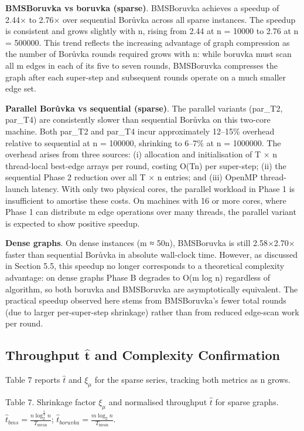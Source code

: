\documentclass[11pt]{article}
\theoremstyle{plain}
\theoremstyle{remark}
\begin{document}
\textbf{BMSBoruvka vs boruvka (sparse)}. BMSBoruvka achieves a speedup
of 2.44× to 2.76× over sequential Borůvka across all sparse instances.
The speedup is consistent and grows slightly with n, rising from 2.44 at
n = 10000 to 2.76 at n = 500000. This trend reflects the increasing
advantage of graph compression as the number of Borůvka rounds required
grows with n: while boruvka must scan all m edges in each of its five to
seven rounds, BMSBoruvka compresses the graph after each super-step and
subsequent rounds operate on a much smaller edge set.

\textbf{Parallel Borůvka vs sequential (sparse)}. The parallel variants
(par\_T2, par\_T4) are consistently slower than sequential Borůvka on
this two-core machine. Both par\_T2 and par\_T4 incur approximately
12--15\% overhead relative to sequential at n = 100000, shrinking to
6--7\% at n = 1000000. The overhead arises from three sources: (i)
allocation and initialisation of T × n thread-local best-edge arrays per
round, costing O(Tn) per super-step; (ii) the sequential Phase 2
reduction over all T × n entries; and (iii) OpenMP thread-launch
latency. With only two physical cores, the parallel workload in Phase 1
is insufficient to amortise these costs. On machines with 16 or more
cores, where Phase 1 can distribute m edge operations over many threads,
the parallel variant is expected to show positive speedup.

\textbf{Dense graphs}. On dense instances (m ≈ 50n), BMSBoruvka is still
2.58×2.70× faster than sequential Borůvka in absolute wall-clock time.
However, as discussed in Section 5.5, this speedup no longer corresponds
to a theoretical complexity advantage: on dense graphs Phase B degrades
to O(m log n) regardless of algorithm, so both boruvka and BMSBoruvka
are asymptotically equivalent. The practical speedup observed here stems
from BMSBoruvka's fewer total rounds (due to larger per-super-step
shrinkage) rather than from reduced edge-scan work per round.

\subsection{Throughput \(\widehat{\mathbf{t}}\) and Complexity Confirmation}

Table 7 reports \(\widehat{t}\) and \(\xi_{\mu}\) for the sparse series,
tracking both metrics as n grows.

Table 7. Shrinkage factor \(\xi_{\mu}\) and normalised throughput
\(\widehat{t}\) for sparse graphs.
\({\widehat{t}}_{bms} = \frac{n\log_{2}^{\frac{2}{3}}n}{T_{\text{mean}}}\);
\({\widehat{t}}_{boruvka} = \frac{m\log_{2}n}{T_{\text{mean}}}\).
\end{document}
